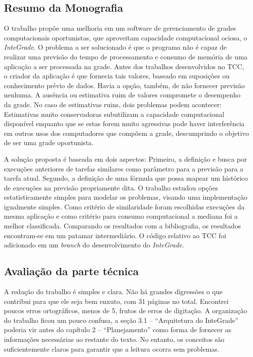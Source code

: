 \documentclass{article}
\begin{document}
\subsection{Resumo da Monografia}
	O trabalho propõe uma melhoria em um software de gerenciamento de grades computacionais oportunistas, que aproveitam capacidade computacional ociosa, o \emph{InteGrade}. O problema a ser solucionado é que o programa não é capaz de realizar uma previsão do tempo de processamento e consumo de memória de uma aplicação a ser processada na grade. Antes dos trabalhos desenvolvidos no TCC, o criador da aplicação é que fornecia tais valores, baseado em suposições ou conhecimento prévio de dados. Havia a opção, também, de não fornecer previsão nenhuma. A ausência ou estimativa ruim de valores compromete o desempenho da grade. No caso de estimativas ruins, dois problemas podem acontecer: Estimativas muito conservadoras subutilizam a capacidade computacional disponível enquanto que se estas forem muito agressivas pode haver interferência em outros usos dos computadores que compõem a grade, descumprindo o objetivo de ser uma grade oportunista.

	A solução proposta é baseada em dois aspectos: Primeiro, a definição e busca por execuções anteriores de tarefas similares como parâmetro para a previsão para a tarefa atual. Segundo, a definição de uma fórmula que possa mapear um histórico de execuções na previsão propriamente dita. O trabalho estudou opções estatisticamente simples para modelar os problemas, visando uma implementação igualmente simples. Como critério de similaridade foram escolhidas execuções da mesma aplicação e como critério para consumo computacional a mediana foi a melhor classificada. Comparando os resultados com a bibliografia, os resultados encontram-se em um patamar intermediário. O código relativo ao TCC foi adicionado em um \emph{branch} do desenvolvimento do \emph{InteGrade}.
	
\subsection{Avaliação da parte técnica}
	A redação do trabalho é simples e clara. Não há grandes digressões o que contribui para que ele seja bem enxuto, com 31 páginas no total. Encontrei poucos erros ortográficos, menos de 5, frutos de erros de digitação. A organização do trabalho ficou um pouco confusa, a seção 3.1 -- ``Arquitetura do InteGrade'' poderia vir antes do capítulo 2 -- ``Planejamento'' como forma de fornecer as informações necessárias ao restante do texto. No entanto, os conceitos são suficientemente claros para garantir que a leitura ocorra sem problemas.
\end{document}
